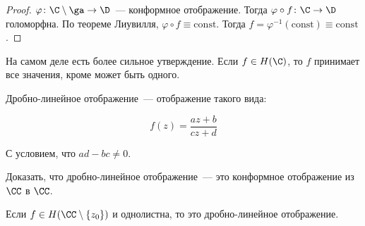 \begin{proof}
    $\varphi\colon \C\setminus\ga\to\D$~--- конформное отображение.
    Тогда $\varphi \circ f\colon \C \to \D$ голоморфна.
    По теореме Лиувилля, $\varphi \circ f \equiv \mathrm{const}$.
    Тогда $f = \varphi^{-1}(\mathrm{const}) \equiv \mathrm{const}$.
\end{proof}

\begin{observation}
    На самом деле есть более сильное утверждение.
    Если $f \in H(\C)$, то $f$ принимает все значения, кроме
    может быть одного.
\end{observation}

\begin{definition}
    Дробно-линейное отображение~--- отображение такого вида:

    \[
        f(z) = \frac{az + b}{cz + d}
    \]

    С условием, что $ad - bc \ne 0$.
\end{definition}

\begin{exercise}
    Доказать, что дробно-линейное отображение~--- это конформное
    отображение из $\CC$ в $\CC$.
\end{exercise}

\begin{theorem}
    Если $f \in H(\CC \setminus \{ z_0 \})$ и однолистна,
    то это дробно-линейное отображение.
\end{theorem}


